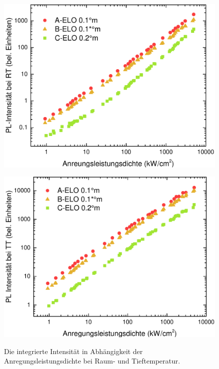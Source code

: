 %
%
\begin{figure}[htb]
  \centering
  \begin{minipage}[t]{0.49\textwidth}
    \centering
    \includegraphics[width=\textwidth]{Bilder/TS4045/intRT.pdf}
    \label{}
  \end{minipage}
	\hfill
  \begin{minipage}[t]{0.49\textwidth}
    \centering
    \includegraphics[width=\linewidth]{Bilder/TS4045/intTT.pdf}
    \label{}
  \end{minipage}
	\caption{Die integrierte Intensität in Abhängigkeit der Anregungsleistungsdichte bei Raum- und Tieftemperatur. }
\end{figure}
%